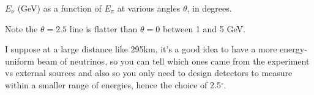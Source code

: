 \begin{enumerate}[label=\textbf{\alph*}.]
\begin{center}
        \small{$E_\nu$ (GeV) as a function of $E_\pi$ at various angles $\theta$, in degrees.
        
        Note the $\theta=2.5$ line is flatter than $\theta=0$ between 1 and 5 GeV.}
    \end{center}

    I suppose at a large distance like 295km, it's a good idea to have a more energy-uniform beam of neutrinos, so you can tell which ones came from the experiment vs external sources and also so you only need to design detectors to measure within a smaller range of energies, hence the choice of 2.5$^\circ$.

  \end{enumerate}

